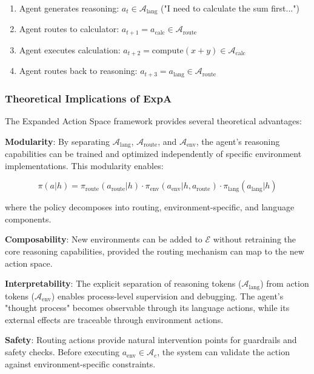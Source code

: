 \begin{enumerate}
    \item Agent generates reasoning: $a_t \in \mathcal{A}_{\text{lang}}$ ("I need to calculate the sum first...")
    \item Agent routes to calculator: $a_{t+1} = a_{\text{calc}} \in \mathcal{A}_{\text{route}}$
    \item Agent executes calculation: $a_{t+2} = \text{compute}(x + y) \in \mathcal{A}_{\text{calc}}$
    \item Agent routes back to reasoning: $a_{t+3} = a_{\text{lang}} \in \mathcal{A}_{\text{route}}$

\end{enumerate}
\subsubsection{Theoretical Implications of ExpA}

The Expanded Action Space framework provides several theoretical advantages:

\textbf{Modularity}: By separating $\mathcal{A}_{\text{lang}}$, $\mathcal{A}_{\text{route}}$, and $\mathcal{A}_{\text{env}}$, the agent's reasoning capabilities can be trained and optimized independently of specific environment implementations. This modularity enables:

$$\pi(a | h) = \pi_{\text{route}}(a_{\text{route}} | h) \cdot \pi_{\text{env}}(a_{\text{env}} | h, a_{\text{route}}) \cdot \pi_{\text{lang}}(a_{\text{lang}} | h)$$

where the policy decomposes into routing, environment-specific, and language components.

\textbf{Composability}: New environments can be added to $\mathcal{E}$ without retraining the core reasoning capabilities, provided the routing mechanism can map to the new action space.

\textbf{Interpretability}: The explicit separation of reasoning tokens ($\mathcal{A}_{\text{lang}}$) from action tokens ($\mathcal{A}_{\text{env}}$) enables process-level supervision and debugging. The agent's "thought process" becomes observable through its language actions, while its external effects are traceable through environment actions.

\textbf{Safety}: Routing actions provide natural intervention points for guardrails and safety checks. Before executing $a_{\text{env}} \in \mathcal{A}_e$, the system can validate the action against environment-specific constraints.

